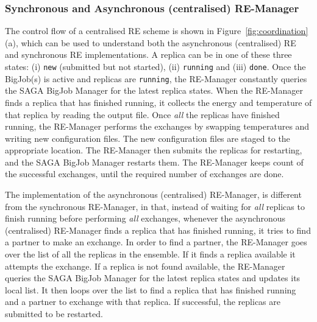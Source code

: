 \documentclass{rspublic}
\newcommand{\alnote}[1]{ {\textcolor{blue} { ***andre: #1 }}}
\newcommand{\alnote}[1]{}
\begin{document}
\subsubsection{Synchronous and Asynchronous (centralised) RE-Manager}



The control flow of a centralised RE scheme is shown in
Figure~\ref{fig:coordination}(a), which can be used to understand both
the asynchronous (centralised) RE and synchronous RE implementations.
A replica can be in one of these three states: (i) \texttt{new} (submitted but not started), (ii) \texttt{running} and (iii) \texttt{done}.
Once the BigJob(s) is active and replicas are \texttt{running}, the RE-Manager constantly
queries the SAGA BigJob Manager for the latest replica states.  When
the RE-Manager finds a replica that has finished running, it collects
the energy and temperature of that replica by reading the output
file. Once \emph{all} the replicas have finished running, the
RE-Manager performs the exchanges by swapping temperatures and writing
new configuration files. The new configuration files are staged to the
appropriate location. The RE-Manager then submits the replicas for
restarting, and the SAGA BigJob Manager restarts them. The RE-Manager
keeps count of the successful exchanges, until the required number of
exchanges are done.

The implementation of the asynchronous (centralised) RE-Manager, is
different from the synchronous RE-Manager, in that, instead of waiting
for \emph{all} replicas to finish running before performing \emph{all}
exchanges, whenever the asynchronous (centralised) RE-Manager finds a
replica that has finished running, it tries to find a partner to make
an exchange. In order to find a partner, the RE-Manager goes over the
list of all the replicas in the ensemble. If it finds a replica
available it attempts the exchange. If a replica is not found
available, the RE-Manager queries the SAGA BigJob Manager for the
latest replica states and updates its local list. It then loops over
the list to find a replica that has finished running and a partner to
exchange with that replica.  If successful, the replicas are submitted
to be restarted. %
\end{document}
